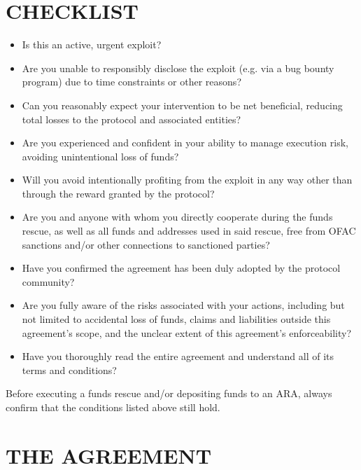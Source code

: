 \documentclass{article}
\begin{document}
\section{CHECKLIST}

\begin{itemize}
    \item Is this an active, urgent exploit?
    \item Are you unable to responsibly disclose the exploit (e.g. via a bug bounty program) due to time constraints or other reasons?
    \item Can you reasonably expect your intervention to be net beneficial, reducing total losses to the protocol and associated entities?
    \item Are you experienced and confident in your ability to manage execution risk, avoiding unintentional loss of funds?
    \item Will you avoid intentionally profiting from the exploit in any way other than through the reward granted by the protocol?
    \item Are you and anyone with whom you directly cooperate during the funds rescue, as well as all funds and addresses used in said rescue, free from OFAC sanctions and/or other connections to sanctioned parties?
    \item Have you confirmed the agreement has been duly adopted by the protocol community?
    \item Are you fully aware of the risks associated with your actions, including but not limited to accidental loss of funds, claims and liabilities outside this agreement's scope, and the unclear extent of this agreement's enforceability?
    \item Have you thoroughly read the entire agreement and understand all of its terms and conditions?
\end{itemize}

Before executing a funds rescue and/or depositing funds to an ARA, always confirm that the conditions listed above still hold.

\section{THE AGREEMENT}
\end{document}
